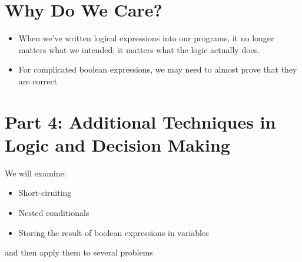 \documentclass[letterpaper,10pt,english]{sphinxmanual}
\begin{document}
\section{Why Do We Care?}
\label{\detokenize{lecture_notes/lec11_conditionals2:why-do-we-care}}\begin{itemize}
\item {} 
When we’ve written logical expressions into our programs, it no
longer matters what we intended; it matters what the logic actually
does.

\item {} 
For complicated boolean expressions, we may need to almost prove that
they are correct

\end{itemize}


\section{Part 4: Additional Techniques in Logic and Decision Making}
\label{\detokenize{lecture_notes/lec11_conditionals2:part-4-additional-techniques-in-logic-and-decision-making}}
We will examine:
\begin{itemize}
\item {} 
Short-ciruiting

\item {} 
Nested conditionals

\item {} 
Storing the result of boolean expressions in variables

\end{itemize}

and then apply them to several problems
\end{document}
